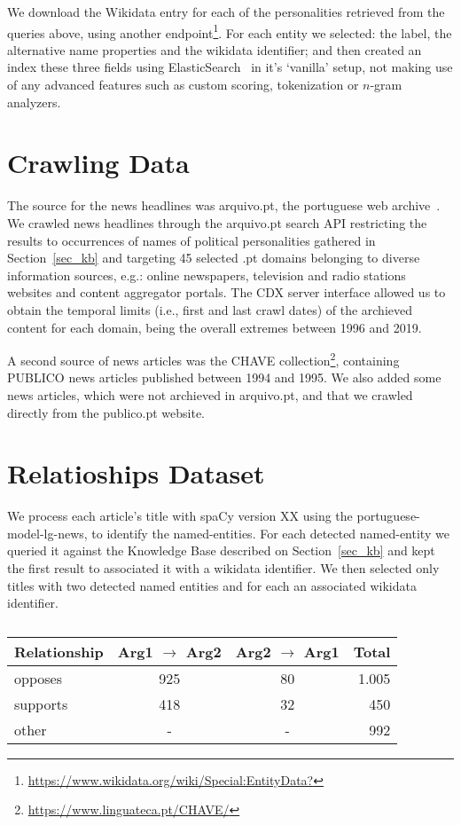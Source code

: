 \documentclass[11pt,a4paper]{article}
\begin{document}
We download the Wikidata entry for each of the personalities retrieved from the queries above, using another endpoint\footnote{\url{https://www.wikidata.org/wiki/Special:EntityData?}}. For each entity
we selected: the label, the alternative name properties and the wikidata identifier; and then created an index these three fields using ElasticSearch~\cite{10.5555/2904394} in it's `vanilla' setup, not making use of any advanced features such as custom scoring, tokenization or $n$-gram analyzers. 


\section{Crawling Data}
\label{sec:crawl}

The source for the news headlines was arquivo.pt, the portuguese web archive~\cite{SearchPastPWA2013}. We crawled news headlines through the arquivo.pt search API restricting the results to occurrences of names of political personalities gathered in Section~\ref{sec_kb} and targeting 45 selected .pt domains belonging to diverse information sources, e.g.: online newspapers, television and radio stations websites and content aggregator portals. The CDX server interface allowed us to obtain the temporal limits (i.e., first and last crawl dates) of the archieved content for each domain, being the overall extremes between 1996 and 2019.

A second source of news articles was the CHAVE collection\footnote{\url{https://www.linguateca.pt/CHAVE/}}\cite{DBLP:conf/clef/SantosR04, santos-rocha-2001-evaluating}, containing PUBLICO news articles published between 1994 and 1995. We also added some news articles, which were not archieved in arquivo.pt, and that we crawled directly from the publico.pt website.

\section{Relatioships Dataset}
\label{subsubsec:rel_data_annot}

We process each article's title with spaCy version XX using the portuguese-model-lg-news, to identify the named-entities. For each detected named-entity we queried it against the Knowledge Base described on Section~\ref{sec_kb} and kept the first result to associated it with a wikidata identifier. We then selected only titles with two detected named entities and for each an associated wikidata identifier.


\begin{table}[!h]
\centering
\begin{tabular}{lccr}
\hline \textbf{Relationship} & \textbf{Arg1 $\rightarrow$ Arg2} & \textbf{Arg2 $\rightarrow$ Arg1} & \textbf{Total} \\ \hline
opposes        &  925 & 80  & 1.005 \\
supports       &  418 & 32  &   450 \\
other          &    - & -   &   992 \\
\hline
\end{tabular}
\caption{\label{font-table}  }
\end{table}
\end{document}
